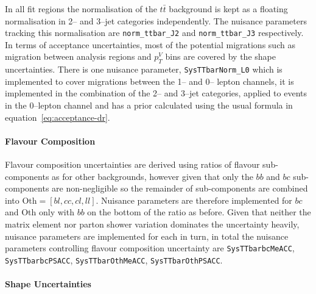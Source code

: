 In all fit regions the normalisation of the $t\bar{t}$ background is kept as a
floating normalisation in 2-- and 3--jet categories independently. The nuisance
parameters tracking this normalisation are \texttt{norm\_ttbar\_J2} and
\texttt{norm\_ttbar\_J3} respectively. In terms of acceptance uncertainties,
most of the potential migrations such as migration between analysis regions and
$p_T^V$ bins are covered by the shape uncertainties. There is one nuisance
parameter, \texttt{SysTTbarNorm\_L0} which is implemented to cover migrations
between the 1-- and 0-- lepton channels, it is implemented in the combination of
the 2-- and 3--jet categories, applied to events in the 0--lepton channel and
has a prior calculated using the usual formula in
equation~\ref{eq:acceptance-dr}.

\paragraph{Flavour Composition}

Flavour composition uncertainties are derived using ratios of flavour
sub-components as for other backgrounds, however given that only the $bb$ and
$bc$ sub-components are non-negligible so the remainder of sub-components are
combined into $\text{Oth} = [bl, cc, cl, ll]$. Nuisance parameters are therefore
implemented for $bc$ and Oth only with $bb$ on the bottom of the ratio as
before. Given that neither the matrix element nor parton shower variation
dominates the uncertainty heavily, nuisance parameters are implemented for each
in turn, in total the nuisance parameters controlling flavour composition
uncertainty are \texttt{SysTTbarbcMeACC}, \texttt{SysTTbarbcPSACC},
\texttt{SysTTbarOthMeACC}, \texttt{SysTTbarOthPSACC}.

\paragraph{Shape Uncertainties}

